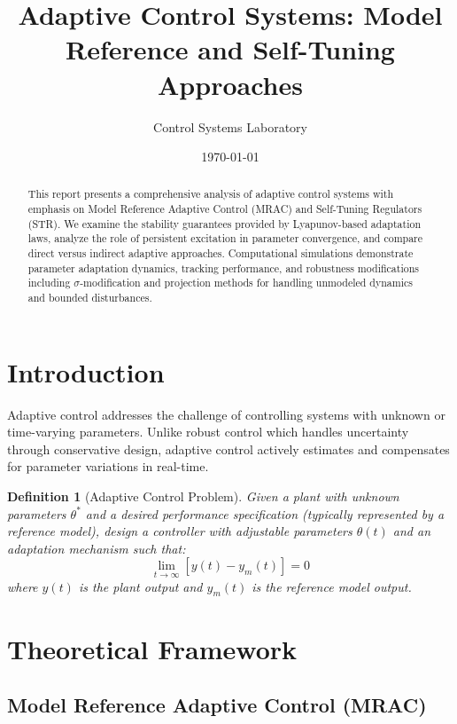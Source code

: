 \documentclass[a4paper, 11pt]{article}
\title{Adaptive Control Systems: Model Reference and Self-Tuning Approaches}
\author{Control Systems Laboratory}
\date{\today}
\newtheorem{definition}{Definition}[section]
\begin{document}
\maketitle

\begin{abstract}
This report presents a comprehensive analysis of adaptive control systems with emphasis on
Model Reference Adaptive Control (MRAC) and Self-Tuning Regulators (STR). We examine the
stability guarantees provided by Lyapunov-based adaptation laws, analyze the role of
persistent excitation in parameter convergence, and compare direct versus indirect adaptive
approaches. Computational simulations demonstrate parameter adaptation dynamics, tracking
performance, and robustness modifications including $\sigma$-modification and projection
methods for handling unmodeled dynamics and bounded disturbances.
\end{abstract}

\section{Introduction}

Adaptive control addresses the challenge of controlling systems with unknown or time-varying
parameters. Unlike robust control which handles uncertainty through conservative design,
adaptive control actively estimates and compensates for parameter variations in real-time.

\begin{definition}[Adaptive Control Problem]
Given a plant with unknown parameters $\theta^*$ and a desired performance specification
(typically represented by a reference model), design a controller with adjustable parameters
$\hat{\theta}(t)$ and an adaptation mechanism such that:
\begin{equation}
\lim_{t \to \infty} [y(t) - y_m(t)] = 0
\end{equation}
where $y(t)$ is the plant output and $y_m(t)$ is the reference model output.
\end{definition}

\section{Theoretical Framework}

\subsection{Model Reference Adaptive Control (MRAC)}
\end{document}
